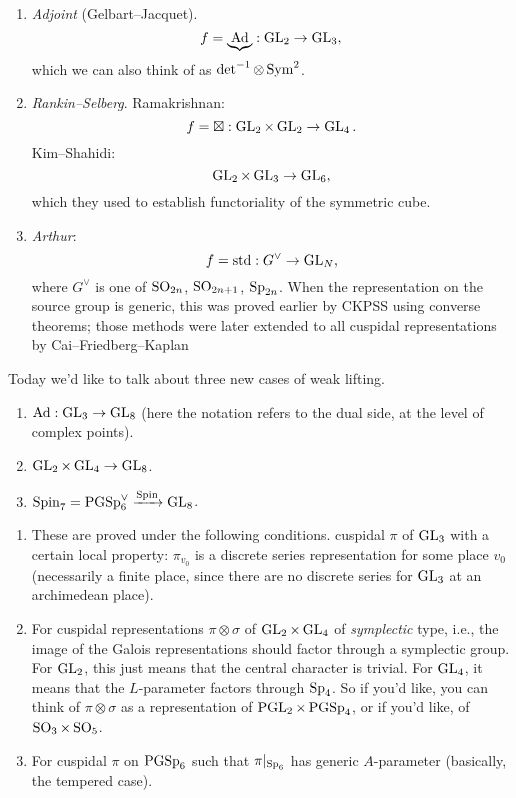 \documentclass[reqno]{amsart} 
\begin{document}
\begin{example}
  \begin{enumerate}
  \item \emph{Adjoint} (Gelbart--Jacquet).
    \begin{equation*}
      f = \underbrace
      {\operatorname{Ad}}
      : \operatorname{GL}_2 \rightarrow \operatorname{GL}_3,
    \end{equation*}
    which we can also think of as $\det^{-1} \otimes \operatorname{Sym}^2$.
  \item \emph{Rankin--Selberg}.  Ramakrishnan:
    \begin{equation*}
      f = \boxtimes : \operatorname{GL}_2 \times \operatorname{GL}_2 \rightarrow \operatorname{GL}_4 .
    \end{equation*}
    Kim--Shahidi:
    \begin{equation*}
      \operatorname{GL}_2 \times \operatorname{GL}_3 \rightarrow \operatorname{GL}_6,
    \end{equation*}
    which they used to establish functoriality of the symmetric cube.
  \item \emph{Arthur}:
    \begin{equation*}
      f = \operatorname{std} : G^\vee \rightarrow \operatorname{GL}_N ,
    \end{equation*}
    where $G^\vee $ is one of $\operatorname{SO}_{2 n}$, $\operatorname{SO}_{2 n + 1}$, $\operatorname{Sp}_{2 n}$.  When the representation on the source group is generic, this was proved earlier by CKPSS using converse theorems; those methods were later extended to all cuspidal representations by Cai--Friedberg--Kaplan
  \end{enumerate}
\end{example}

Today we'd like to talk about three new cases of weak lifting.
\begin{enumerate}
\item $\operatorname{Ad} : \operatorname{GL}_3 \rightarrow \operatorname{GL}_8 $ (here the notation refers to the dual side, at the level of complex points).
\item $\operatorname{GL}_2 \times \operatorname{GL}_4 \rightarrow \operatorname{GL}_8$.
\item $\operatorname{Spin}_7 = \operatorname{PGSp}_6^\vee \xrightarrow{\operatorname{Spin}} \operatorname{GL}_8$.
\end{enumerate}
\begin{enumerate}
\item These are proved under the following conditions.  cuspidal $\pi$ of $\operatorname{GL}_3$ with a certain local property: $\pi_{v_0 }$ is a discrete series representation for some place $v_0$ (necessarily a finite place, since there are no discrete series for $\operatorname{GL}_3 $ at an archimedean place).
\item For cuspidal representations $\pi \otimes \sigma $ of $\operatorname{GL}_2 \times \operatorname{GL}_4 $ of \emph{symplectic} type, i.e., the image of the Galois representations should factor through a symplectic group.  For $\operatorname{GL}_2$, this just means that the central character is trivial.  For $\operatorname{GL}_4$, it means that the $L$-parameter factors through $\operatorname{Sp}_4$.  So if you'd like, you can think of $\pi \otimes \sigma$ as a representation of $\operatorname{PGL}_2 \times \operatorname{PGSp}_4$, or if you'd like, of $\operatorname{SO}_3 \times \operatorname{SO}_5$.
\item For cuspidal $\pi$ on $\operatorname{PGSp}_6 $ such that $\pi |_{\operatorname{Sp}_6}$ has generic $A$-parameter (basically, the tempered case).
\end{enumerate}
\end{document}

